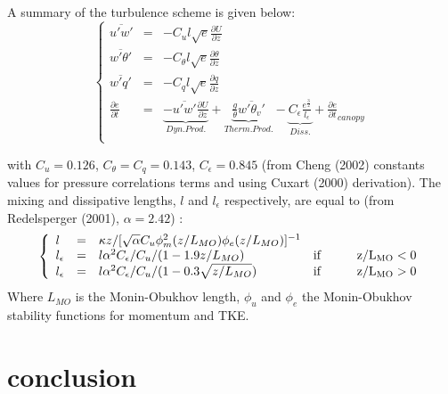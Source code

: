 A summary of the turbulence scheme is given below:
\begin{equation}
\left\{
\begin{array}{lllllll}
\overline{u'w'}&=& - C_u l\sqrt{e}\frac{\partial U}{\partial z} \\
\overline{w'\theta'}&=& - C_{\theta}l\sqrt{e}\frac{\partial \theta}{\partial z} \\
\overline{w'q'}&=& - C_{q} l\sqrt{e}\frac{\partial q}{\partial z} \\
\frac{\partial e}{\partial t} &=& \underbrace{- \overline{u'w'}\frac{\partial U}{\partial z}}_{Dyn. Prod.} +\underbrace{ \frac{g}{\theta}\overline{w'\theta_v'}}_{Therm. Prod.} -\underbrace{C_\epsilon \frac{e^{\frac{3}{2}}}{l_\epsilon}}_{Diss.} + \frac{\partial e}{\partial t}_{canopy}\\
\end{array}
\right.
\end{equation}

with $C_u=0.126$, $C_\theta=C_q=0.143$, $C_\epsilon=0.845$ (from Cheng \etal (2002)\nocite{Cheng2002} constants values for pressure correlations terms and using Cuxart \etal (2000)\nocite{Cuxart2000} derivation).
The mixing and dissipative lengths, $l$ and $l_\epsilon$ respectively, are equal to (from Redelsperger \etal (2001)\nocite{Redelsperger2001}, $\alpha=2.42$) :
\begin{equation}
\left\{
\begin{array}{lllllll}
l&=&\kappa z/[\sqrt{\alpha}C_u  \phi_m^2(z/L_{MO})\phi_e(z/L_{MO})]^{-1}&\\
l_\epsilon&=&l \alpha^2 C_\epsilon / C_u / (1-1.9z/L_{MO}) & {\rm if \hspace*{1.cm}z/L_{MO}<0}\\
l_\epsilon&=&l \alpha^2 C_\epsilon / C_u / (1-0.3\sqrt{z/L_{MO}}) & {\rm if\hspace*{1.cm} z/L_{MO}>0}\\
\end{array}
\right.
\end{equation}
Where $L_{MO}$ is the Monin-Obukhov length, $\phi_u$ and $\phi_e$ the Monin-Obukhov stability functions for momentum and TKE. \\


\section{conclusion}

